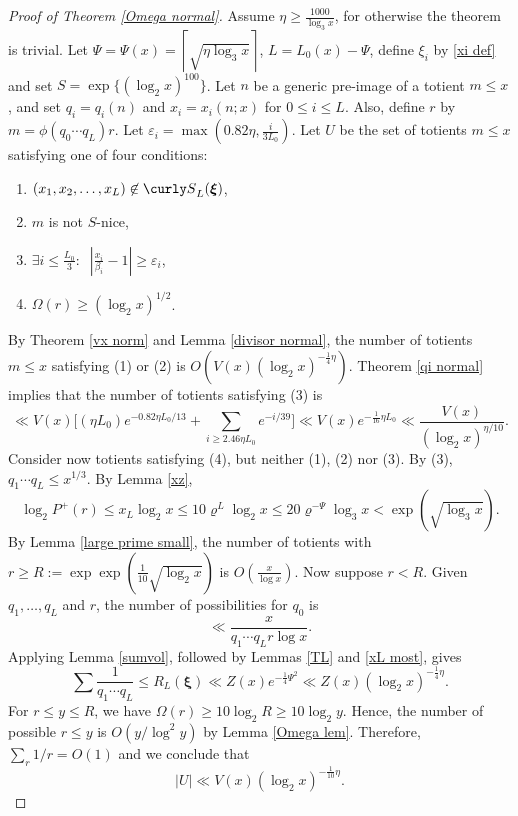 \documentclass[11pt]{amsart}
\theoremstyle{remark}
\theoremstyle{plain}
\numberwithin{equation}{section}
\newcommand{\be}{\begin{equation}}
\newcommand{\ee}{\end{equation}}
\renewcommand{\b}{\ensuremath{\beta}}
\newcommand{\eps}{\ensuremath{\varepsilon}}
\renewcommand{\(}{\left(}
\renewcommand{\)}{\right)}
\newcommand{\cl}[1]{{\ensuremath{\left\lceil #1 \right\rceil}}}
\newcommand{\fancyS}{{\curly S}}
\renewcommand{\le}{\leqslant}
\renewcommand{\ge}{\geqslant}
\renewcommand{\rho}{\varrho}
\newcommand{\om}{\Omega}
\newcommand{\bxi}{\boldsymbol\xi}
\newcommand{\vxi}{\bxi}
\begin{document}



\begin{proof}
[Proof of Theorem \ref{Omega normal}] Assume $\eta \ge \frac{1000}{\log_3 x}$, 
for otherwise the theorem is trivial. 
Let $\Psi=\Psi(x)=\cl{\sqrt{\eta\log_3 x}}$, $L=L_0(x)-\Psi$, 
define $\xi_i$ by \eqref{xi def} and set
$S=\exp\{(\log_2 x)^{100}\}$.
Let $n$ be a generic pre-image of a totient $m\le x$, and set
$q_i=q_i(n)$ and $x_i=x_i(n;x)$ for $0\le i\le L$. Also, define $r$ by
$m=\phi(q_0\cdots q_L)r$.  Let $\eps_i=\max(0.82\eta, \frac{i}{3L_0})$.
Let $U$ be the set of totients $m\le x$ satisfying one of four
conditions:
\begin{enumerate}
\item $(x_1, x_2, \ldots, x_L) \not\in \fancyS_L(\vxi)$,
\item $m$  is not $S$-nice,
\item $\exists i\le \frac{L_0}3 : \;\; \left| \frac{x_i}{\b_i}-1\right| \ge \eps_i$,
\item $\om(r) \ge (\log_2 x)^{1/2}$. 
\end{enumerate}
By Theorem \ref{vx norm} and Lemma \ref{divisor normal},
 the number of totients $m\le x$ satisfying (1) or (2) is $O(V(x)(\log_2 x)^{-\frac14 \eta})$.
Theorem \ref{qi normal} implies that the number of totients satisfying (3) is
\[
 \ll V(x) \Bigg[(\eta L_0) e^{-0.82\eta L_0/13} + \sum_{i\ge 2.46\eta L_0} e^{-i/39}\Bigg]
 \ll V(x) e^{-\frac1{16}\eta L_0} \ll \frac{V(x)}{(\log_2 x)^{\eta/10}}.
\]
Consider now totients satisfying (4), but neither (1), (2) nor (3).
By (3), $q_1\cdots q_L \le x^{1/3}$.  By Lemma \ref{xz},
\[
 \log_2 P^+(r) \le x_L \log_2 x \le 10\rho^L \log_2 x \le 20\rho^{-\Psi}\log_3 x <
\exp(\sqrt{\log_3 x}).
\]
By Lemma \ref{large prime small}, the number of totients with
$r\ge R := \exp \exp (\frac1{10}\sqrt{\log_2 x})$ is $O(\frac{x}{\log x})$.
Now suppose $r<R$.  Given $q_1,\ldots,q_L$ and $r$, the number of possibilities for $q_0$
is 
\[
 \ll \frac{x}{q_1\cdots q_L r \log x}.
\]
Applying Lemma \ref{sumvol}, followed by Lemmas \ref{TL} and \ref{xL most}, gives
\[
 \sum \frac{1}{q_1\cdots q_L} \le R_L(\bxi) \ll Z(x)e^{-\frac14 \Psi^2}\ll Z(x)
(\log_2 x)^{-\frac14 \eta}.
\]
For $r\le y\le R$, we have $\om(r)\ge 10\log_2 R\ge 10\log_2 y$.  Hence, the number
of possible $r\le y$ is $O(y/\log^2 y)$ by Lemma \ref{Omega lem}.  Therefore,
$\sum_r 1/r = O(1)$ and we conclude that
\be\label{U(x)}
|U| \ll V(x) (\log_2 x)^{-\frac1{10} \eta}.
\ee


\end{proof}
\end{document}
